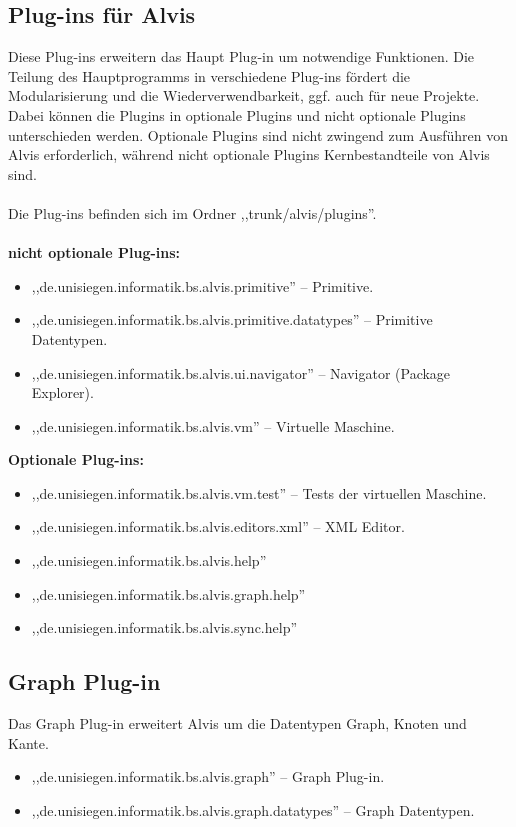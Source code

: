 \documentclass[10pt,a4paper,oneside]{scrbook}
\begin{document}
\subsection{Plug-ins für Alvis}
Diese Plug-ins erweitern das Haupt Plug-in um notwendige Funktionen. Die Teilung des Hauptprogramms in verschiedene Plug-ins fördert die Modularisierung und die Wiederverwendbarkeit, ggf. auch für neue Projekte.
\\
Dabei können die Plugins in optionale Plugins und nicht optionale Plugins unterschieden werden. Optionale Plugins sind nicht zwingend zum Ausführen von Alvis erforderlich, während nicht optionale Plugins Kernbestandteile von Alvis sind.
\\ \\
Die Plug-ins befinden sich im Ordner ,,trunk/alvis/plugins''.
\\ \\
\textbf{nicht optionale Plug-ins:}
\begin{itemize}
\item ,,de.unisiegen.informatik.bs.alvis.primitive'' -- Primitive.
\item ,,de.unisiegen.informatik.bs.alvis.primitive.datatypes'' -- Primitive Datentypen.
\item ,,de.unisiegen.informatik.bs.alvis.ui.navigator'' -- Navigator (Package Explorer).
\item ,,de.unisiegen.informatik.bs.alvis.vm'' -- Virtuelle Maschine.
\end{itemize}
\textbf{Optionale Plug-ins:}
\begin{itemize}
\item ,,de.unisiegen.informatik.bs.alvis.vm.test'' -- Tests der virtuellen Maschine.
\item ,,de.unisiegen.informatik.bs.alvis.editors.xml'' -- XML Editor.
\item ,,de.unisiegen.informatik.bs.alvis.help''
\item ,,de.unisiegen.informatik.bs.alvis.graph.help''
\item ,,de.unisiegen.informatik.bs.alvis.sync.help''
\end{itemize}
\subsection{Graph Plug-in}
Das Graph Plug-in erweitert Alvis um die Datentypen Graph, Knoten und Kante.
\begin{itemize}
\item ,,de.unisiegen.informatik.bs.alvis.graph'' -- Graph Plug-in.
\item ,,de.unisiegen.informatik.bs.alvis.graph.datatypes'' -- Graph Datentypen.
\end{itemize}
\end{document}
